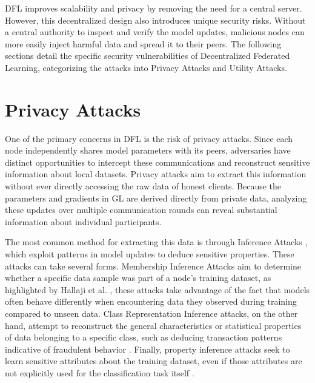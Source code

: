 DFL improves scalability and privacy by removing the need for a central server. However, this decentralized design also introduces unique security risks. Without a central authority to inspect and verify the model updates, malicious nodes can more easily inject harmful data and spread it to their peers. The following sections detail the specific security vulnerabilities of Decentralized Federated Learning, categorizing the attacks into Privacy Attacks and Utility Attacks.

\section{Privacy Attacks}
One of the primary concerns in DFL is the risk of privacy attacks. Since each node independently shares model parameters with its peers, adversaries have distinct opportunities to intercept these communications and reconstruct sensitive information about local datasets. Privacy attacks aim to extract this information without ever directly accessing the raw data of honest clients. Because the parameters and gradients in GL are derived directly from private data, analyzing these updates over multiple communication rounds can reveal substantial information about individual participants.

The most common method for extracting this data is through Inference Attacks \cite{melis2019exploiting}, which exploit patterns in model updates to deduce sensitive properties. These attacks can take several forms. Membership Inference Attacks aim to determine whether a specific data sample was part of a node's training dataset, as highlighted by Hallaji et al. \cite{hallaji2024decentralized}, these attacks take advantage of the fact that models often behave differently when encountering data they observed during training compared to unseen data. Class Representation Inference attacks, on the other hand, attempt to reconstruct the general characteristics or statistical properties of data belonging to a specific class, such as deducing transaction patterns indicative of fraudulent behavior \cite{fredrikson2015model, zhang2020secret}. Finally, property inference attacks seek to learn sensitive attributes about the training dataset, even if those attributes are not explicitly used for the classification task itself \cite{ateniese2015hacking, ganju2018property}.

